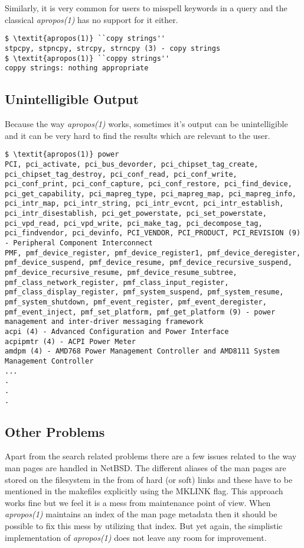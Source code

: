\documentclass[titlepage, a4paper, 12pt]{article}
\begin{document}
Similarly, it is very common for users to misspell keywords in a query and the
classical \textit{apropos(1)} has no support for it either.
\begin{lstlisting}
$ \textit{apropos(1)} ``copy strings''
stpcpy, stpncpy, strcpy, strncpy (3) - copy strings
$ \textit{apropos(1)} ``coppy strings''
coppy strings: nothing appropriate
\end{lstlisting}

\subsection{Unintelligible Output}
Because the way \textit{apropos(1)} works, sometimes it's output can be unintelligible and
it can be very hard to find the results which are relevant to the user.
\begin{lstlisting}
$ \textit{apropos(1)} power
PCI, pci_activate, pci_bus_devorder, pci_chipset_tag_create,
pci_chipset_tag_destroy, pci_conf_read, pci_conf_write,
pci_conf_print, pci_conf_capture, pci_conf_restore, pci_find_device,
pci_get_capability, pci_mapreg_type, pci_mapreg_map, pci_mapreg_info,
pci_intr_map, pci_intr_string, pci_intr_evcnt, pci_intr_establish,
pci_intr_disestablish, pci_get_powerstate, pci_set_powerstate,
pci_vpd_read, pci_vpd_write, pci_make_tag, pci_decompose_tag,
pci_findvendor, pci_devinfo, PCI_VENDOR, PCI_PRODUCT, PCI_REVISION (9)
- Peripheral Component Interconnect
PMF, pmf_device_register, pmf_device_register1, pmf_device_deregister,
pmf_device_suspend, pmf_device_resume, pmf_device_recursive_suspend,
pmf_device_recursive_resume, pmf_device_resume_subtree,
pmf_class_network_register, pmf_class_input_register,
pmf_class_display_register, pmf_system_suspend, pmf_system_resume,
pmf_system_shutdown, pmf_event_register, pmf_event_deregister,
pmf_event_inject, pmf_set_platform, pmf_get_platform (9) - power
management and inter-driver messaging framework
acpi (4) - Advanced Configuration and Power Interface
acpipmtr (4) - ACPI Power Meter
amdpm (4) - AMD768 Power Management Controller and AMD8111 System
Management Controller
...
.
.
.
\end{lstlisting}
\subsection{Other Problems}
Apart from the search related problems there are a few issues related to
the way man pages are handled in NetBSD. The different aliases of the man pages
are stored on the filesystem in the from of hard (or soft) links and these
have to be mentioned in the makefiles explicitly using the MKLINK flag. This
approach works fine but we feel it is a mess from maintenance point of view.
When \textit{apropos(1)} maintains an index of the man page metadata then it
should be possible to fix this mess by utilizing that index. But yet again, the
simplistic implementation of \textit{apropos(1)} does not leave any room for
improvement.
\end{document}

